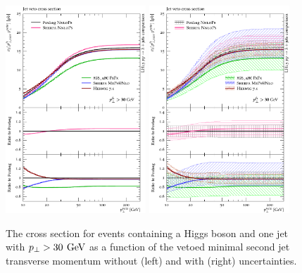 \begin{figure}[t!]
  \centering
  \includegraphics[width=0.47\textwidth]{figures/hjetscomp_u_xs_jet_veto_j1_30.pdf}
  \hfill
  \includegraphics[width=0.47\textwidth]{figures/hjetscomp_xs_jet_veto_j1_30.pdf}
  \caption{
    The cross section for events containing a Higgs boson 
    and one jet with $p_\perp>30\,\text{\:GeV}$ as a function of
    the vetoed minimal second jet transverse momentum without
    (left) and with (right) uncertainties.
    \label{fig:hjetscomp:results:jvobs:jvxs1j30}
  }
\end{figure}

